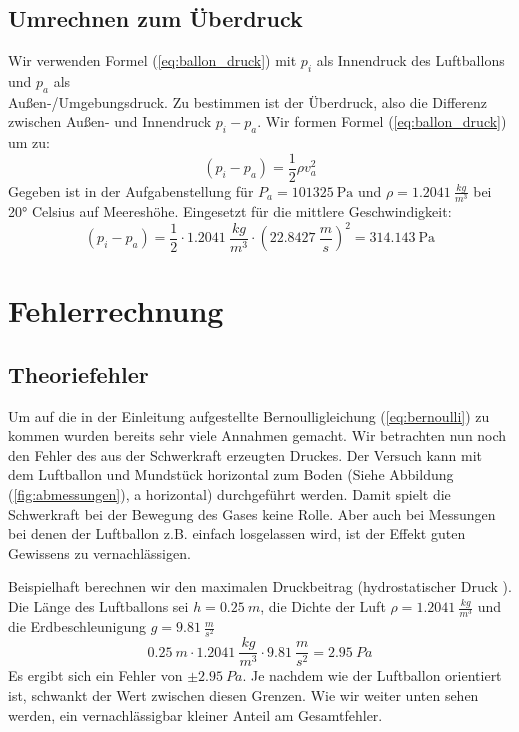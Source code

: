 \documentclass{article}
\begin{document}
    \subsection{Umrechnen zum Überdruck}
    Wir verwenden Formel (\ref{eq:ballon_druck}) mit \(p_i\) als Innendruck des Luftballons und \(p_a\) als \\
    Außen-/Umgebungsdruck.
    Zu bestimmen ist der Überdruck, also die Differenz zwischen Außen- und Innendruck \(p_i - p_a\).
    Wir formen Formel (\ref{eq:ballon_druck}) um zu:
    \begin{equation} \label{eq:ballon_uberdruck}
        (p_i - p_a) = \frac{1}{2} \rho v_a^2
    \end{equation}
    Gegeben ist in der Aufgabenstellung \cite{Aufgabenstellung} für \( P_a = \SI{101 325}{\pascal} \) und \(\rho = \SI{1.2041}{\frac{kg}{m^3}} \) bei 20° Celsius auf Meereshöhe. 
    Eingesetzt für die mittlere Geschwindigkeit:
    \begin{equation} \label{eq:druck_wert}
        (p_i - p_a) = \frac{1}{2} \cdot \SI{1.2041}{\frac{kg}{m^3}} \cdot { ( \SI{22.8427}{\frac{m}{s}} )}^2 = \SI{314.143}{\pascal}
    \end{equation}
    
    \section{Fehlerrechnung}\label{fehlerrechnung}
        \subsection{Theoriefehler}
            Um auf die in der Einleitung aufgestellte Bernoulligleichung (\ref{eq:bernoulli}) zu kommen wurden bereits sehr viele Annahmen gemacht.
            Wir betrachten nun noch den Fehler des aus der Schwerkraft erzeugten Druckes.
            Der Versuch kann mit dem Luftballon und Mundstück horizontal zum Boden (Siehe Abbildung (\ref{fig:abmessungen}), a horizontal) durchgeführt werden.
            Damit spielt die Schwerkraft bei der Bewegung des Gases keine Rolle. Aber auch bei Messungen bei denen der Luftballon z.B. einfach losgelassen wird,
            ist der Effekt guten Gewissens zu vernachlässigen.

            Beispielhaft berechnen wir den maximalen Druckbeitrag (hydrostatischer Druck \cite{Luftdruck}).
            Die Länge des Luftballons sei \(h = \SI{0.25}{m}\), die Dichte der Luft \(\rho = \SI{1.2041}{\frac{kg}{m^3}} \) \cite{Aufgabenstellung}
            und die Erdbeschleunigung \(g = \SI{9.81}{\frac{m}{s^2}} \)
            \begin{equation}
                \SI{0.25}{m} \cdot \SI{1.2041}{\frac{kg}{m^3}} \cdot \SI{9.81}{\frac{m}{s^2}} = \SI{2.95}{Pa} %
            \end{equation}
            Es ergibt sich ein Fehler von \(\pm \SI{2.95}{Pa}\). Je nachdem wie der Luftballon orientiert ist, schwankt der Wert zwischen diesen Grenzen.
            Wie wir weiter unten sehen werden, ein vernachlässigbar kleiner Anteil am Gesamtfehler.
\end{document}
